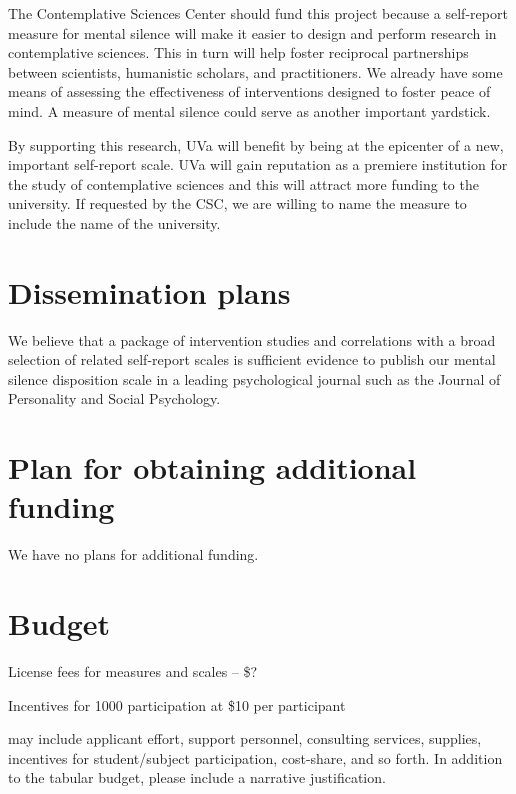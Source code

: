 \documentclass[12pt]{article}
\begin{document}
The Contemplative Sciences Center should fund this project because
a self-report measure for mental silence will make it easier to design
and perform research in contemplative sciences.
This in turn will help foster reciprocal
partnerships between scientists, humanistic scholars, and practitioners.
We already have some means of assessing the effectiveness of interventions
designed to foster peace of mind.
A measure of mental silence could serve as another important yardstick.

By supporting this research, UVa will benefit by being at the
epicenter of a new, important self-report scale. UVa will gain reputation as a
premiere institution for the study of contemplative sciences and this
will attract more funding to the university. If requested by the CSC,
we are willing to name the measure to include the name of the university.

\section{Dissemination plans}

We believe that a package of intervention studies and
correlations with a broad selection of related self-report scales is sufficient evidence
to publish our mental silence disposition scale in a leading
psychological journal such as the Journal of Personality and Social Psychology.

\section{Plan for obtaining additional funding}

We have no plans for additional funding.

\section{Budget}

License fees for measures and scales -- \$?

Incentives for 1000 participation at \$10 per participant

may include applicant effort, support personnel, consulting services,
supplies, incentives for student/subject participation, cost-share,
and so forth. In addition to the tabular budget, please include a
narrative justification.



\end{document}
